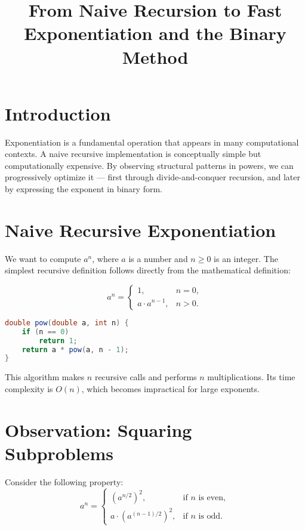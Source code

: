 \documentclass[a4paper,12pt]{article}
\title{From Naive Recursion to Fast Exponentiation and the Binary Method}
\author{}
\date{}
\begin{document}
    \maketitle

    \section{Introduction}

    Exponentiation is a fundamental operation that appears in many computational contexts.
    A naive recursive implementation is conceptually simple but computationally expensive.
    By observing structural patterns in powers, we can progressively optimize it --- first through divide-and-conquer recursion, and later by expressing the exponent in binary form.

    \section{Naive Recursive Exponentiation}

    We want to compute \( a^n \), where \( a \) is a number and \( n \ge 0 \) is an integer.
    The simplest recursive definition follows directly from the mathematical definition:

    \[
        a^n =
        \begin{cases}
            1, & n = 0, \\
            a \cdot a^{n-1}, & n > 0.
        \end{cases}
    \]

    \begin{lstlisting}[language=Java, caption={Naive recursive exponentiation}]
double pow(double a, int n) {
    if (n == 0)
        return 1;
    return a * pow(a, n - 1);
}
    \end{lstlisting}

    This algorithm makes \( n \) recursive calls and performs \( n \) multiplications.
    Its time complexity is \( O(n) \), which becomes impractical for large exponents.

    \section{Observation: Squaring Subproblems}

    Consider the following property:
    \[
        a^n =
        \begin{cases}
        (a^{n/2})^2, & \text{if $n$ is even}, \\
        a \cdot (a^{(n-1)/2})^2, & \text{if $n$ is odd}.
        \end{cases}
    \]
\end{document}
